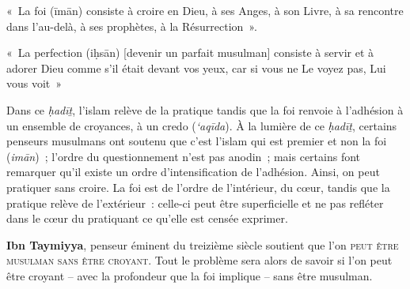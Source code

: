 \begin{Def}[īmān]
«~La foi (īmān) consiste à croire en Dieu, à ses Anges, à son Livre, à
sa rencontre dans l'au-delà, à ses prophètes, à la Résurrection~».
\end{Def}

\begin{Def}[iḥsān]

«~La perfection (iḥsān) {[}devenir un parfait musulman{]} consiste à
servir et à adorer Dieu comme s'il était devant vos yeux, car si vous ne
Le voyez pas, Lui vous voit~»
\end{Def}

Dans ce \emph{ḥadīṯ}, l'islam relève de la pratique tandis que la foi
renvoie à l'adhésion à un ensemble de croyances, à un credo
(\emph{`aqīda}). À la lumière de ce \emph{ḥadīṯ}, certains penseurs
musulmans ont soutenu que c'est l'islam qui est premier et non la foi
(\emph{imān})~; l'ordre du questionnement n'est pas anodin~; mais
certains font remarquer qu'il existe un ordre d'intensification de
l'adhésion. Ainsi, on peut pratiquer sans croire. La foi est de l'ordre
de l'intérieur, du cœur, tandis que la pratique relève de l'extérieur~:
celle-ci peut être superficielle et ne pas refléter dans le cœur du
pratiquant ce qu'elle est censée exprimer.

 \textbf{Ibn Taymiyya},
penseur éminent du treizième siècle soutient que l'on \textsc{peut être musulman
sans être croyant}. Tout le problème sera alors de savoir si l'on peut
être croyant -- avec la profondeur que la foi implique -- sans être
musulman.


